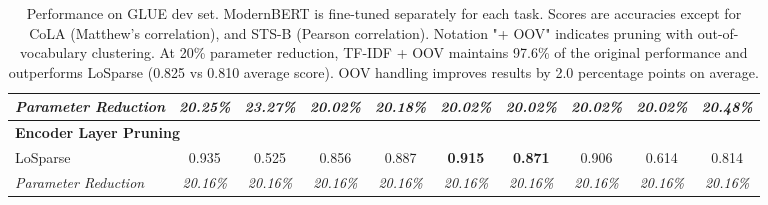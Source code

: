 \begin{table*}[h]
\begin{tabular}{l@{\hspace{25pt}}ccccccccc}
\textit{Parameter Reduction} & \textit{20.25\%} & \textit{23.27\%} & \textit{20.02\%} & \textit{20.18\%} & \textit{20.02\%} & \textit{20.02\%} & \textit{20.02\%} & \textit{20.02\%} & \textit{20.48\%} \\
\midrule
\multicolumn{10}{l}{\textbf{Encoder Layer Pruning}} \\
LoSparse & 0.935 & 0.525 & 0.856 & 0.887 & \textbf{0.915} & \textbf{0.871} & 0.906 & 0.614 & 0.814 \\
\textit{Parameter Reduction} & \textit{20.16\%} & \textit{20.16\%} & \textit{20.16\%} & \textit{20.16\%} & \textit{20.16\%} & \textit{20.16\%} & \textit{20.16\%} & \textit{20.16\%} & \textit{20.16\%} \\
\bottomrule
\end{tabular}
\caption{Performance on GLUE dev set. ModernBERT is fine-tuned separately for each task. Scores are accuracies except for CoLA (Matthew's correlation), and STS-B (Pearson correlation). Notation "+ OOV" indicates pruning with out-of-vocabulary clustering. At 20\% parameter reduction, TF-IDF + OOV maintains 97.6\% of the original performance and outperforms LoSparse (0.825 vs 0.810 average score). OOV handling improves results by 2.0 percentage points on average.}

\label{tab:results}
\end{table*}